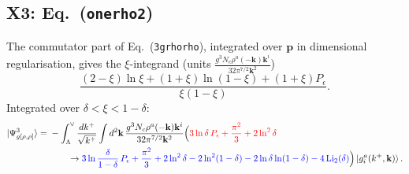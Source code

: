 \documentclass[10pt]{article}
\def\v#1{\mathbf{#1}}
\newcommand{\old}[1]{{\color{red}#1}}
\newcommand{\new}[1]{{\color{blue}#1}}
\newcommand{\eqn}[1]{Eq.~(\texttt{#1})}
\newcommand{\Li}{\mathrm{Li}_2}
\begin{document}
\subsection{X3: \eqn{onerho2}}\label{sec:X3}
The commutator part of \eqn{3grhorho}, integrated over $\v p$ in dimensional regularisation, gives the $\xi$-integrand (units $\frac{g^3N_c\rho^a(-\v k)\v k^i}{32\pi^{7/2}\v k^2}$)
\begin{equation}
\frac{(2-\xi)\ln\xi+(1+\xi)\ln(1-\xi)+(1+\xi)P_\epsilon}{\xi(1-\xi)}.
\end{equation}
Integrated over $\delta<\xi<1-\delta$:
\begin{align}
\ket{\Psi^3_{g[\rho,\rho]}}={}&-\int_\Lambda^\vee\frac{dk^+}{\sqrt{k^+}}\int d^2\v k\,\frac{g^3N_c\rho^a(-\v k)\v k^i}{32\pi^{7/2}\v k^2}\Big(\old{3\ln\delta\,P_\epsilon+\frac{\pi^2}{3}+2\ln^2\delta}\notag\\
&\qquad\to\new{3\ln\frac{\delta}{1-\delta}\,P_\epsilon+\frac{\pi^2}{3}+2\ln^2\delta-2\ln^2(1-\delta)-2\ln\delta\ln(1-\delta)-4\,\Li(\delta)}\Big)\ket{g^a_i(k^+,\v k)}.
\end{align}
\end{document}
